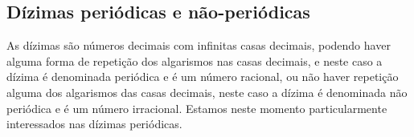 




\subsection{Dízimas periódicas e não-periódicas}
As dízimas são números decimais com infinitas casas decimais, podendo haver alguma forma de repetição dos algarismos nas casas decimais, e neste caso a dízima é denominada periódica e é um número racional, ou não haver repetição alguma dos algarismos das casas decimais, neste caso a dízima é denominada não periódica e é um número irracional. Estamos neste momento particularmente interessados nas dízimas periódicas.

